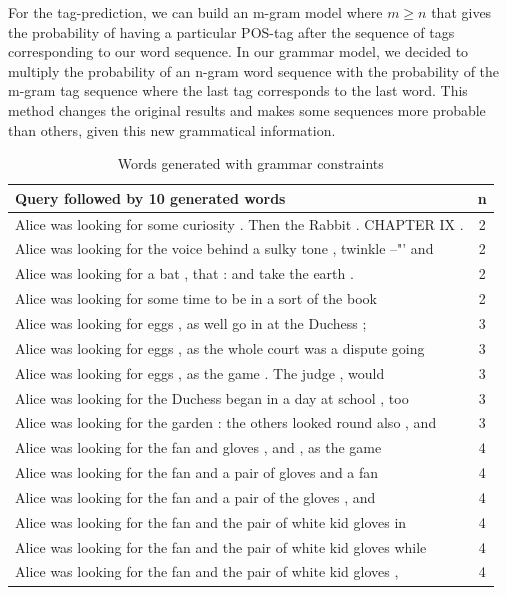 \documentclass[a4paper,12pt]{article}
\begin{document}
For the tag-prediction, we can build an m-gram model where $m \ge n$ that gives the probability of having a particular POS-tag after the sequence of tags corresponding to our word sequence. In our grammar model, we decided to multiply the probability of an n-gram word sequence with the probability of the m-gram tag sequence where the last tag corresponds to the last word. This method changes the original results and makes some sequences more probable than others, given this new grammatical information.

\begin{table}[]
\centering
\small
\caption{Words generated with grammar constraints}
\label{grammarsent}
\begin{tabular}{| l |c|}
\hline
Query followed by 10 generated words                                   & n \\ \hline
Alice was looking for some curiosity . Then the Rabbit . CHAPTER IX .  & 2 \\ \hline
Alice was looking for the voice behind a sulky tone , twinkle --"' and & 2 \\ \hline
Alice was looking for a bat , that : and take the earth .              & 2 \\ \hline
Alice was looking for some time to be in a sort of the book            & 2 \\ \hline
Alice was looking for eggs , as well go in at the Duchess ;            & 3 \\ \hline
Alice was looking for eggs , as the whole court was a dispute going    & 3 \\ \hline
Alice was looking for eggs , as the game . The judge , would           & 3 \\ \hline
Alice was looking for the Duchess began in a day at school , too       & 3 \\ \hline
Alice was looking for the garden : the others looked round also , and  & 3 \\ \hline
Alice was looking for the fan and gloves , and , as the game           & 4 \\ \hline
Alice was looking for the fan and a pair of gloves and a fan           & 4 \\ \hline
Alice was looking for the fan and a pair of the gloves , and           & 4 \\ \hline
Alice was looking for the fan and the pair of white kid gloves in      & 4 \\ \hline
Alice was looking for the fan and the pair of white kid gloves while   & 4 \\ \hline
Alice was looking for the fan and the pair of white kid gloves ,       & 4 \\ \hline
\end{tabular}
\end{table}
\end{document}
